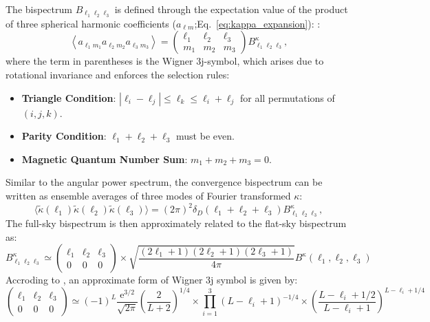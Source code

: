 The bispectrum $B_{\ell_1 \ell_2 \ell_3}$ is defined through the expectation value of the product of three spherical harmonic coefficients  ($a_{\ell m}$;Eq.~\ref{eq:kappa_expansion}): :
\begin{equation}
    \left\langle a_{\ell_1 m_1} a_{\ell_2 m_2} a_{\ell_3 m_3} \right\rangle = \begin{pmatrix} 
            \ell_1 & \ell_2 & \ell_3 \\ 
            m_1 & m_2 & m_3 
        \end{pmatrix} B^\kappa_{\ell_1 \ell_2 \ell_3},
\end{equation}
where the term in parentheses is the Wigner 3j-symbol, which arises due to rotational invariance and enforces the selection rules:
\begin{itemize}
    \item \textbf{Triangle Condition}: $|\ell_i - \ell_j| \leq \ell_k \leq \ell_i + \ell_j$ for all permutations of $(i, j, k)$.
    \item \textbf{Parity Condition}: $\ell_1 + \ell_2 + \ell_3$ must be even.
    \item \textbf{Magnetic Quantum Number Sum}: $m_1 + m_2 + m_3 = 0$.
\end{itemize}
Similar to the angular power spectrum, the convergence bispectrum can be written as ensemble averages of three modes of Fourier transformed $\kappa$:
\begin{equation}
    \langle \tilde{\kappa}(\mathbf{\ell}_1) \tilde{\kappa}(\mathbf{\ell}_2) \tilde{\kappa}(\mathbf{\ell}_3) \rangle = (2\pi)^2 \delta_{D}(\mathbf{\ell}_1 + \mathbf{\ell}_2 + \mathbf{\ell}_3) B^\kappa_{\ell_1 \ell_2 \ell_3},
\end{equation}
The full-sky bispectrum is then approximately related to the flat-sky bispectrum as:
\begin{equation}
    B_{\ell_1 \ell_2 \ell_3}^\kappa \simeq\left(\begin{array}{ccc}
        \ell_1 & \ell_2 & \ell_3 \\
        0 & 0 & 0
        \end{array}\right) \times \sqrt{\frac{\left(2 \ell_1+1\right)\left(2 \ell_2+1\right)\left(2 \ell_3+1\right)}{4 \pi}}  B^\kappa\left(\ell_1, \ell_2, \ell_3\right)
\end{equation}
Accroding to \citet{2004MNRAS.348..897T}, an approximate form of Wigner 3j symbol is given by:
\begin{equation}
    \left(\begin{array}{ccc}
        \ell_1 & \ell_2 & \ell_3 \\
        0 & 0 & 0
        \end{array}\right) \simeq(-1)^L \frac{\mathrm{e}^{3/2}}{\sqrt{2 \pi}}\left(\frac{2}{L+2}\right)^{1 / 4} \times \prod_{i=1}^3\left(L-\ell_i+1\right)^{-1 / 4} \times\left(\frac{L-\ell_i+1 / 2}{L-\ell_i+1}\right)^{L-\ell_i+1 / 4}
\end{equation}
